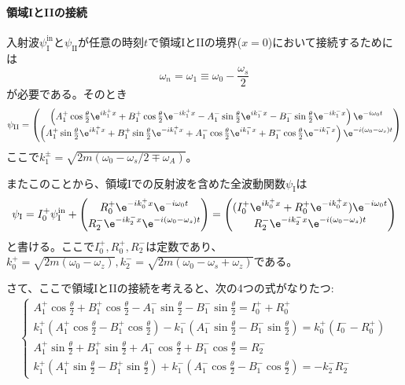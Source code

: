 \paragraph{領域IとIIの接続}
入射波$\psi_\mathrm{I}^\mathrm{in}$と$\psi_\mathrm{II}$が任意の時刻$t$で領域IとIIの境界($x=0$)において接続するためには
\begin{equation}
\omega_n=\omega_1 \equiv \omega_0 -\frac{\omega_s}{2}
\end{equation}
が必要である。そのとき
\begin{equation}
\psi_\mathrm{II}=\begin{pmatrix} \left(A_1^+ \cos \frac{\theta}{2} \e^{ik_1^+x}+ B_1^+ \cos \frac{\theta}{2} \e^{-ik_1^+x} - A_1^- \sin \frac{\theta}{2} \e^{ik_1^-x}- B_1^- \sin \frac{\theta}{2} \e^{-ik_1^-x}\right) \e^{-i\omega_0t} \\ \left(A_1^+ \sin \frac{\theta}{2} \e^{ik_1^+x}+ B_1^+ \sin \frac{\theta}{2} \e^{-ik_1^+x} + A_1^- \cos \frac{\theta}{2} \e^{ik_1^-x}+ B_1^- \cos \frac{\theta}{2} \e^{-ik_1^-x}\right) \e^{-i(\omega_0-\omega_s)t} \end{pmatrix}
\end{equation}
ここで$k_1^\pm=\sqrt{2m(\omega_0-\omega_s/2 \mp \omega_A)}$。

またこのことから、領域Iでの反射波を含めた全波動関数$\psi_\mathrm{I}$は
\begin{equation}
\psi_\mathrm{I} =I_0^+ \psi_\mathrm{I}^\mathrm{in} +\begin{pmatrix} R_0^+ \e^{-ik_0^+x}\e^{ -i\omega_0 t} \\ R_2^- \e^{-ik_2^-x}\e^{ -i (\omega_0-\omega_s)t} \end{pmatrix} =\begin{pmatrix} (I_0^+ \e^{ik_0^+x} +R_0^+\e^{-ik_0^+x} )\e^{-i\omega_0 t} \\ R_2^- \e^{-ik_2^-x}\e^{ -i (\omega_0-\omega_s)t} \end{pmatrix}
\end{equation}
と書ける。ここで$I_0^+,R_0^+,R_2^-$は定数であり、$k_0^+ =\sqrt{2m(\omega_0 -\omega_z)},k_2^- =\sqrt{2m(\omega_0 -\omega_s +\omega_z)}$である。

さて、ここで領域IとIIの接続を考えると、次の4つの式がなりたつ:
\begin{align}
\left\{\begin{array}{l}
A_1^+ \cos \frac{\theta}{2} +B_1^+\cos \frac{\theta}{2} -A_1^-\sin\frac{\theta}{2} -B_1^-\sin\frac{\theta}{2} = I_0^+ +R_0^+ \\
k_1^+(A_1^+ \cos \frac{\theta}{2} -B_1^+\cos \frac{\theta}{2} )-k_1^-(A_1^-\sin\frac{\theta}{2} -B_1^-\sin\frac{\theta}{2} )=k_0^+(I_0^--R_0^+)\\
A_1^+ \sin \frac{\theta}{2} +B_1^+\sin \frac{\theta}{2} +A_1^-\cos\frac{\theta}{2} +B_1^-\cos\frac{\theta}{2} = R_2^- \\
k_1^+(A_1^+ \sin \frac{\theta}{2} -B_1^+\sin \frac{\theta}{2}) +k_1^-(A_1^-\cos\frac{\theta}{2} -B_1^-\cos\frac{\theta}{2}) = -k_2^-R_2^-
\end{array} \right. \label{Nonreso_setsuzoku}
\end{align}

